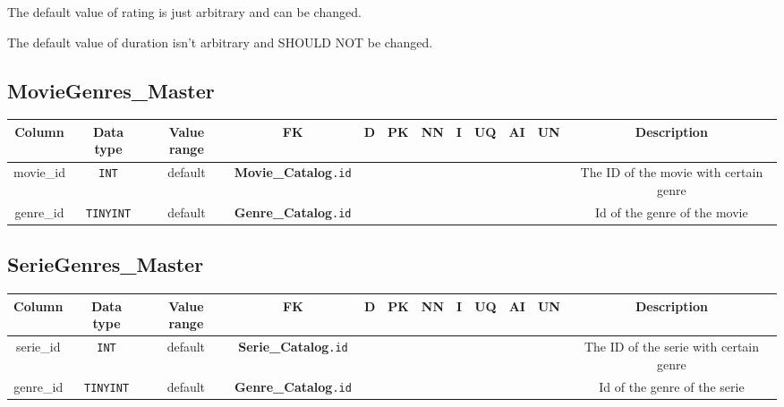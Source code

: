 \documentclass{article}
\newcommand{\dbtable}{\subsection}
\newcommand{\cmark}{\ding{51}}%
\newcommand{\mono}{\texttt}
\begin{document}
	The default value of rating is just arbitrary and can be changed.
	
	The default value of duration isn't arbitrary and SHOULD NOT be changed.

	\dbtable{MovieGenres\_Master}
	\begin{table}[h!]
		\centering
		\begin{tabular}{|c|c|c|c|c|c|c|c|c|c|c|c|}
			\toprule
			\bfseries Column & \bfseries Data type & \bfseries Value range & \bfseries FK & \bfseries D & \bfseries PK & \bfseries NN & \bfseries I & \bfseries UQ & \bfseries AI & \bfseries UN & \bfseries Description\\
			
			\midrule
			movie\_id & \mono{INT} & default & \textbf{Movie\_Catalog}\mono{.id} & & & \cmark & \cmark & & & \cmark & The ID of the movie with certain genre\\
			
			\midrule
			genre\_id & \mono{TINYINT} & default & \textbf{Genre\_Catalog}\mono{.id} & & & \cmark & \cmark & & & \cmark & Id of the genre of the movie\\
			
			\bottomrule
		\end{tabular}
	\end{table}

	\dbtable{SerieGenres\_Master}
	\begin{table}[h!]
		\centering
		\begin{tabular}{|c|c|c|c|c|c|c|c|c|c|c|c|}
			\toprule
			\bfseries Column & \bfseries Data type & \bfseries Value range & \bfseries FK & \bfseries D & \bfseries PK & \bfseries NN & \bfseries I & \bfseries UQ & \bfseries AI & \bfseries UN & \bfseries Description\\
			
			\midrule
			serie\_id & \mono{INT} & default & \textbf{Serie\_Catalog}\mono{.id} & & & \cmark & \cmark & & & \cmark & The ID of the serie with certain genre\\
			
			\midrule
			genre\_id & \mono{TINYINT} & default & \textbf{Genre\_Catalog}\mono{.id} & & & \cmark & \cmark & & & \cmark & Id of the genre of the serie\\
			
			\bottomrule
		\end{tabular}
	\end{table}
\end{document}
